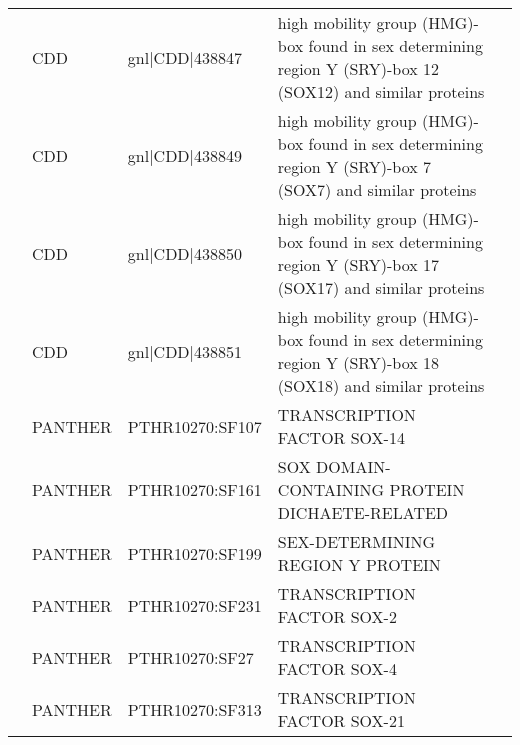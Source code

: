 \documentclass[../main.tex]{subfiles}
\begin{document}
\begin{landscape}
\begin{longtable}{@{}cllll@{}}
		                                & CDD                  & gnl|CDD|438847  & high mobility group (HMG)-box found in sex determining region Y (SRY)-box 12 (SOX12) and similar proteins                                    & \\
		                                & CDD                  & gnl|CDD|438849  & high mobility group (HMG)-box found in sex determining region Y (SRY)-box 7 (SOX7) and similar proteins                                      & \\
		                                & CDD                  & gnl|CDD|438850  & high mobility group (HMG)-box found in sex determining region Y (SRY)-box 17 (SOX17) and similar proteins                                    & \\
		                                & CDD                  & gnl|CDD|438851  & high mobility group (HMG)-box found in sex determining region Y (SRY)-box 18 (SOX18) and similar proteins                                    & \\
		                                & PANTHER              & PTHR10270:SF107 & TRANSCRIPTION FACTOR SOX-14                                                                                                                  & \\
		                                & PANTHER              & PTHR10270:SF161 & SOX DOMAIN-CONTAINING PROTEIN DICHAETE-RELATED                                                                                               & \\
		                                & PANTHER              & PTHR10270:SF199 & SEX-DETERMINING REGION Y PROTEIN                                                                                                             & \\
		                                & PANTHER              & PTHR10270:SF231 & TRANSCRIPTION FACTOR SOX-2                                                                                                                   & \\
		                                & PANTHER              & PTHR10270:SF27  & TRANSCRIPTION FACTOR SOX-4                                                                                                                   & \\
		                                & PANTHER              & PTHR10270:SF313 & TRANSCRIPTION FACTOR SOX-21                                                                                                                  & \\

\end{longtable}
\end{landscape}
\end{document}
